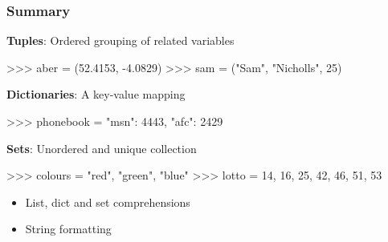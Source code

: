 \documentclass{beamer}
\begin{document}
\begin{frame}[fragile]
\frametitle{Summary}
\textbf{Tuples}: Ordered grouping of related variables
\begin{code}
>>> aber = (52.4153, -4.0829)
>>> sam = ("Sam", "Nicholls", 25)
\end{code}

\vskip 0.2cm
\textbf{Dictionaries}: A key-value mapping
\begin{code}
>>> phonebook = {"msn": 4443, "afc": 2429}
\end{code}

\vskip 0.2cm
\textbf{Sets}: Unordered and unique collection
\begin{code}
>>> colours = {"red", "green", "blue"}
>>> lotto = {14, 16, 25, 42, 46, 51, 53}
\end{code}

\begin{itemize}
    \item List, dict and set comprehensions
    \item String formatting
\end{itemize}
\end{frame}
\end{document}
